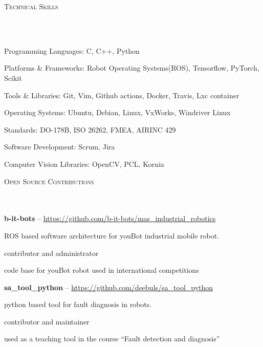 \documentclass{article}
\newcommand{\header}[1]{{
\hspace*{-15pt}\vspace*{6pt} \textsc{#1}} \vspace*{-6pt} 
\lineunder
}
\newcommand{\lineunder}{
\vspace*{-8pt} \\ \hspace*{-18pt} 
\hrulefill \\
}
\newcommand{\employer}[4]{{
\vspace*{2pt}%
\textbf{#1} #2 \hfill #3\\ #4 \vspace*{2pt}}
}
\renewcommand{\labelitemii}{
	\raisebox{0.3ex}{\tiny\textbullet}
}
\newenvironment{bullet-list-major}{
\begin{list}{\labelitemii}{\setlength\leftmargin{3pt} 
\topsep 0pt \itemsep -2pt}}{\vspace*{4pt}\end{list}
}
\newenvironment{bullet-list-minor}{
\begin{list}{\labelitemii}{\setlength\leftmargin{15pt} 
\topsep 0pt \itemsep -2pt}}{\vspace*{4pt}\end{list}
}
\begin{document}
\newpage


\vspace*{4pt}%
\header{Technical Skills}
    \begin{bullet-list-major}
    \item Programming Languages: C, C++, Python
    \vspace{2pt}
    \item Platforms \& Frameworks: Robot Operating Systems(ROS), Tensorflow, PyTorch, Scikit
    \vspace{2pt}
    \item Tools \& Libraries: Git, Vim, Github actions, Docker, Travis, Lxc container
    \vspace{2pt}
    \item Operating Systems: Ubuntu, Debian, Linux, VxWorks, Windriver Linux
    \vspace{2pt}
\item Standards:  DO-178B, ISO 26262, FMEA, AIRINC 429
    \vspace{2pt}
\item Software Development: Scrum, Jira
    \vspace{2pt}
\item Computer Vision Libraries: OpenCV, PCL, Kornia
    \end{bullet-list-major}


\vspace*{4pt}%
\header{Open Source Contributions}

\employer{b-it-bots}{-- \url{https://github.com/b-it-bots/mas\_industrial\_robotics}}{}{}
\begin{bullet-list-minor}
    \item ROS based software architecture for youBot industrial mobile robot.
    \item contributor and administrator
    \item code base for youBot robot used in international competitions
\end{bullet-list-minor}
\employer{sa\_tool\_python}{-- \url{https://github.com/deebuls/sa_tool_python} }{}
    {}
    \begin{bullet-list-minor}
    \item python based tool for fault diagnosis in robots.
    \item contributor and maintainer
    \item used as a teaching tool in the course ``Fault detection and diagnosis''
    \end{bullet-list-minor}
\end{document}
